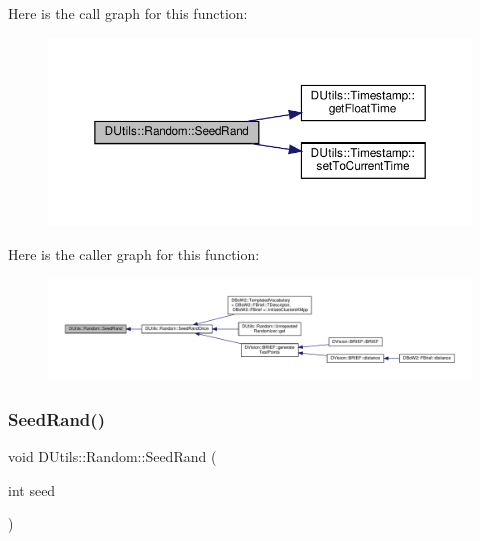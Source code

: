 Here is the call graph for this function\+:\nopagebreak
\begin{figure}[H]
\begin{center}
\leavevmode
\includegraphics[width=350pt]{classDUtils_1_1Random_a719a6489316343a771e062f0be58050f_cgraph}
\end{center}
\end{figure}
Here is the caller graph for this function\+:\nopagebreak
\begin{figure}[H]
\begin{center}
\leavevmode
\includegraphics[width=350pt]{classDUtils_1_1Random_a719a6489316343a771e062f0be58050f_icgraph}
\end{center}
\end{figure}
\mbox{\label{classDUtils_1_1Random_aec19d58856a0cf0b48d783119a497233}} 
\subsubsection{\texorpdfstring{Seed\+Rand()}{SeedRand()}\hspace{0.1cm}{\footnotesize\ttfamily [2/2]}}
{\footnotesize\ttfamily void D\+Utils\+::\+Random\+::\+Seed\+Rand (\begin{DoxyParamCaption}\item[{int}]{seed }\end{DoxyParamCaption})\hspace{0.3cm}{\ttfamily [static]}}

